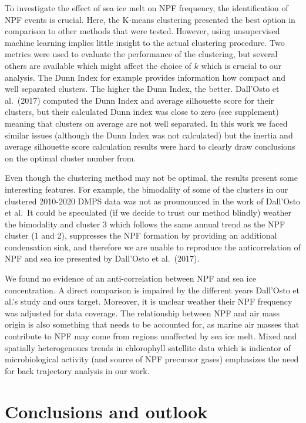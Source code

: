 \documentclass[11pt]{article}
\begin{document}
To investigate the effect of sea ice melt on NPF frequency, the
identification of NPF events is crucial. Here, the K-means clustering
presented the best option in comparison to other methods that were
tested. However, using unsupervised machine learning implies little
insight to the actual clustering procedure. Two metrics were used to
evaluate the performance of the clustering, but several others are
available which might affect the choice of \(k\) which is crucial to our
analysis. The Dunn Index for example provides information how compact
and well separated clusters. The higher the Dunn Index, the better.
Dall'Osto et al.~(2017) computed the Dunn Index and average silhouette
score for their clusters, but their calculated Dunn index was close to
zero (see supplement) meaning that clusters on average are not well
separated. In this work we faced similar issues (although the Dunn Index
was not calculated) but the inertia and average silhouette score
calculation results were hard to clearly draw conclusions on the optimal
cluster number from.

Even though the clustering method may not be optimal, the results
present some interesting features. For example, the bimodality of some
of the clusters in our clustered 2010-2020 DMPS data was not as
prounounced in the work of Dall'Osto et al.~It could be speculated (if
we decide to trust our method blindly) weather the bimodality and
cluster 3 which follows the same annual trend as the NPF cluster (1 and
2), suppresses the NPF formation by providing an additional condensation
sink, and therefore we are unable to reproduce the anticorrelation of
NPF and sea ice presented by Dall'Osto et al.~(2017).

We found no evidence of an anti-correlation between NPF and sea ice
concentration. A direct comparison is impaired by the different years
Dall'Osto et al.'s study and ours target. Moreover, it is unclear
weather their NPF frequency was adjusted for data coverage. The
relationship between NPF and air mass origin is also something that
needs to be accounted for, as marine air masses that contribute to NPF
may come from regions unaffected by sea ice melt. Mixed and spatially
heterogenoues trends in chlorophyll satellite data which is indicator of
microbiological activity (and source of NPF precursor gases) emphasizes
the need for back trajectory analysis in our work.

    \hypertarget{conclusions-and-outlook}{%
\section{Conclusions and outlook}\label{conclusions-and-outlook}}
\end{document}
